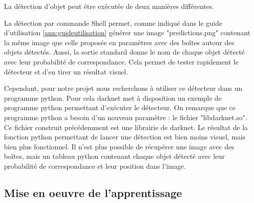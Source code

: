 \documentclass[debug,nodate,hideweeklyreports]{polytech/polytech}
\begin{document}
La détection d'objet peut être exécutée de deux manières différentes.

La détection par commande Shell permet, comme indiqué dans le guide d'utilisation \autoref{ann:guideutilisation} générer une image "predictions.png" contenant la même image que celle proposée en paramètres avec des boîtes autour des objets détectés. Aussi, la sortie standard donne le nom de chaque objet détecté avec leur probabilité de correspondance. Cela permet de tester rapidement le détecteur et d'en tirer un résultat visuel.

Cependant, pour notre projet nous recherchons à utiliser ce détecteur dans un programme python. Pour cela darknet met à disposition un exemple de programme python permettant d'exécuter le détecteur. On remarque que ce programme python a besoin d'un nouveau paramètre : le fichier "libdarknet.so". Ce fichier construit précédemment est une librairie de darknet.
Le résultat de la fonction python permettant de lancer une détection est bien moins visuel, mais bien plus fonctionnel. Il n'est plus possible de récupérer une image avec des boîtes, mais un tableau python contenant chaque objet détecté avec leur probabilité de correspondance et leur position dans l'image.

\subsection{Mise en oeuvre de l'apprentissage}
\end{document}
